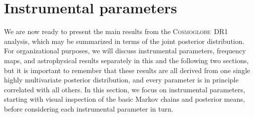 \documentclass[twocolumn]{../../common/aa}
\def\WMAP{\emph{WMAP}}
\newcommand{\BP}{\textsc{BeyondPlanck}}
\newcommand{\cosmoglobe}{\textsc{Cosmoglobe}}
\begin{document}












\section{Instrumental parameters}
\label{sec:instrument}

We are now ready to present the main results from the \cosmoglobe\ DR1 analysis, which may be summarized in terms of the joint posterior distribution. For organizational purposes, we will discuss instrumental parameters, frequency maps, and astrophysical results separately in this and the following two sections, but it is important to remember that these results are all derived from one single highly multivariate posterior distribution, and every parameter is in principle correlated with all others. In this section, we focus on instrumental parameters, starting with visual inspection of the basic Markov chains and posterior means, before considering each instrumental parameter in turn.
\end{document}
